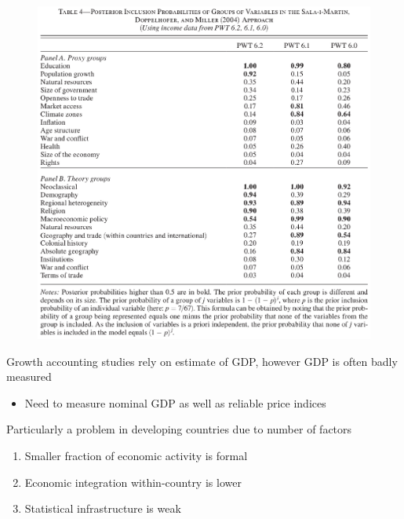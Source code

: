 \documentclass{beamer}
\begin{document}
\begin{frame}
  \begin{figure}
    \includegraphics[scale=.5]{ciccone.eps}
  \end{figure}
\end{frame}


\begin{frame}
  Growth accounting studies rely on estimate of GDP, however GDP is often badly measured
  \begin{itemize}
    \item Need to measure nominal GDP as well as reliable price indices
  \end{itemize}
  \medskip
  Particularly a problem in developing countries due to number of factors
  \begin{enumerate}
    \item Smaller fraction of economic activity is formal
    \item Economic integration within-country is lower
    \item Statistical infrastructure is weak
  \end{enumerate}
\end{frame}
\end{document}
